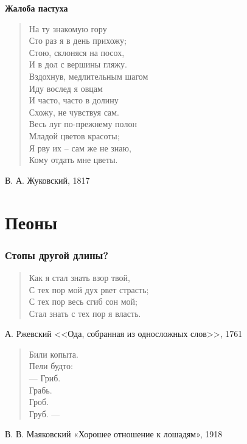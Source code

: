 \documentclass{beamer}
\begin{document}
\begin{frame}

\begin{center}
\textbf{Жалоба пастуха}
\end{center}

\begin{verse}
На ту знакомую гору\\
Сто раз я в день прихожу;\\
Стою, склоняся на посох,\\
И в дол с вершины гляжу.\\
Вздохнув, медлительным шагом\\
Иду вослед я овцам\\
И часто, часто в долину\\
Схожу, не чувствуя сам.\\
Весь луг по-прежнему полон\\
Младой цветов красоты;\\
Я рву их  – сам же не знаю,\\
Кому отдать мне цветы.

\end{verse}

В. А. Жуковский, 1817

\end{frame}


\section{Пеоны}\label{sec:sys} %

\begin{frame}
\frametitle{Стопы другой длины?}

\begin{verse}
Как я стал знать взор твой,\\
С тех пор мой дух рвет страсть;\\
С тех пор весь сгиб сон мой;\\
Стал знать с тех пор я власть.

\end{verse}

А. Ржевский <<Ода, собранная из односложных слов>>, 1761

\begin{verse}
Били копыта.\\
Пели будто:\\
— Гриб.\\
Грабь.\\
Гроб.\\
Груб. —

\end{verse}
В. В. Маяковский «Хорошее отношение к лошадям», 1918

\end{frame}
\end{document}
